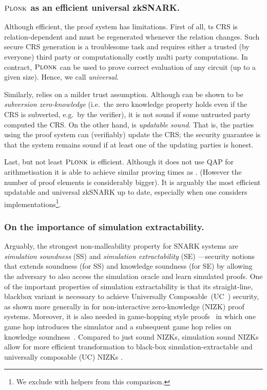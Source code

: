 \documentclass[runningheads,11pt]{llncs}
\begin{document}
	\subsubsection*{$\textsc{Plonk}$ as an efficient universal zkSNARK.}
	Although efficient, the \groth{} proof system has limitations. First of all,
  ts CRS is relation-dependent and must be regenerated whenever the relation
  changes. Such secure CRS generation is a troublesome task and requires
  either a trusted (by everyone) third party or computationally costly multi
  party computations.  In contract, $\textsc{Plonk}$ can be used to prove correct evaluation
  of any circuit (up to a given size). Hence, we call \plonk{} \emph{universal}.
	
	Similarly, \plonk{} relies on a milder trust assumption. 
	Although \groth{} can be shown to be \emph{subversion zero-knowledge} (i.e.~the zero knowledge property holds even if the CRS is subverted, e.g.~by the verifier), it is not sound if some untrusted party computed the CRS. 
	On the other hand, \plonk{} is \emph{updatable sound}. That is, the parties using the proof system can (verifiably) update the CRS; the security guarantee is that the system remains sound if at least one of the updating parties is honest.
	
	Last, but not least $\textsc{Plonk}$ is efficient. Although it does not use QAP for arithmetisation it is able to achieve similar proving times as \groth{}. (However the number of proof elements is considerably bigger). 
	It is arguably the most efficient updatable and universal zkSNARK up to date,
  especially when one considers implementations\footnote{We exclude \sonic{} with helpers
  from this comparison.}. 
	
	\subsubsection*{On the importance of simulation extractability.}
	Arguably, the strongest non-malleability property for SNARK systems are
  \emph{simulation soundness} (SS) and \emph{simulation extractability} (SE)
  \cite{FOCS:Sahai99,C:DDOPS01}---security notions that extends soundness (for
  SS) and knowledge soundness (for SE) by allowing the adversary to also access the simulation oracle and learn simulated proofs. 
	One of the important properties of simulation extractability is that its
	straight-line, blackbox variant is necessary to achieve Universally Composable~(UC~\cite{FOCS:Canetti01}) security, as shown more generally in 	\cite{STOC:CLOS02,AC:Groth06,EC:GroOstSah06} for non-interactive zero-knowledge (NIZK) proof systems. Moreover, it is also needed in game-hopping style proofs~\cite{EPRINT:Shoup04} in which one game hop
	introduces the simulator and a subsequent game hop relies on knowledge
	soundness~\cite{SP:KMSWP16,CCS:CamDriDub17}.
	Compared to just sound NIZKs, simulation sound NIZKs allow for more efficient transformation to black-box simulation-extractable and universally composable (UC) NIZKs \cite{AFRICACRYPT:Baghery19}. 
\end{document}
